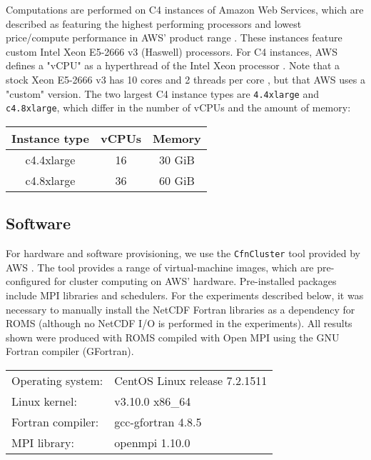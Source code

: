 \documentclass[12pt,a4paper]{article}
\begin{document}

Computations are performed on C4 instances of Amazon Web Services, which are described as featuring the highest performing processors and lowest price/compute performance in AWS' product range . These instances feature custom Intel Xeon E5-2666 v3 (Haswell) processors. For C4 instances, AWS defines a "vCPU" as a hyperthread of the Intel Xeon processor . Note that a stock Xeon E5-2666 v3 has 10 cores and 2 threads per core \citep{web:intelXeon}, but that AWS uses a "custom" version. The two largest C4 instance types are \verb|4.4xlarge| and  \verb|c4.8xlarge|, which differ in the number of vCPUs and the amount of memory:

\begin{center}
\begin{tabular}{ c c c }
 Instance type & vCPUs & Memory \\
 \hline
	c4.4xlarge & 16 & 30 GiB \\
	c4.8xlarge & 36 & 60 GiB\\
\end{tabular}
\end{center}


\subsection{Software}

For hardware and software provisioning, we use the \verb|CfnCluster| tool provided by AWS \citep{web:awscfncluster}. The tool provides a range of virtual-machine images, which are pre-configured for cluster computing on AWS' hardware. Pre-installed packages include MPI libraries and schedulers. For the experiments described below, it was necessary to manually install the NetCDF Fortran libraries as a dependency for ROMS (although no NetCDF I/O is performed in the experiments).
All results shown were produced with ROMS compiled with Open MPI using the GNU Fortran compiler (GFortran).

\begin{center}
	\begin{tabular}{ l l }
		Operating system: & CentOS Linux release 7.2.1511 \\
		Linux kernel: & v3.10.0 x86\_64 \\
		Fortran compiler: & gcc-gfortran 4.8.5 \\
		MPI library: &  openmpi 1.10.0 \\
	\end{tabular}
\end{center}
\end{document}
